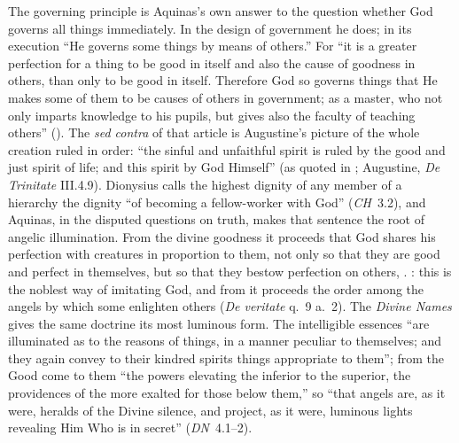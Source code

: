 The governing principle is Aquinas's own answer to the question whether
God governs all things immediately. In the design of government he does;
in its execution ``He governs some things by means of others.'' For ``it is
a greater perfection for a thing to be good in itself and also the cause of
goodness in others, than only to be good in itself. Therefore God so
governs things that He makes some of them to be causes of others in
government; as a master, who not only imparts knowledge to his pupils, but
gives also the faculty of teaching others'' (). The
\emph{sed contra} of that article is Augustine's picture of the whole
creation ruled in order: ``the sinful and unfaithful spirit is ruled by the
good and just spirit of life; and this spirit by God Himself'' (as quoted
in ; Augustine, \emph{De Trinitate} III.4.9).
Dionysius calls the highest dignity of any member of a hierarchy the dignity
``of becoming a fellow-worker with God'' (\emph{CH}~3.2), and Aquinas, in
the disputed questions on truth, makes that sentence the root of angelic
illumination. From the divine goodness it proceeds that God shares his
perfection with creatures in proportion to them, not only so that they are
good and perfect in themselves, but so that they bestow perfection on
others, . : this is the noblest way of imitating God, and
from it proceeds the order among the angels by which some enlighten others
(\emph{De veritate} q.~9 a.~2). The \emph{Divine
Names} gives the same doctrine its most luminous form. The intelligible
essences ``are illuminated as to the reasons of things, in a manner
peculiar to themselves; and they again convey to their kindred spirits
things appropriate to them''; from the Good come to them ``the powers
elevating the inferior to the superior, the providences of the more exalted
for those below them,'' so ``that angels are, as it were, heralds of the
Divine silence, and project, as it were, luminous lights revealing Him Who
is in secret'' (\emph{DN}~4.1--2).

